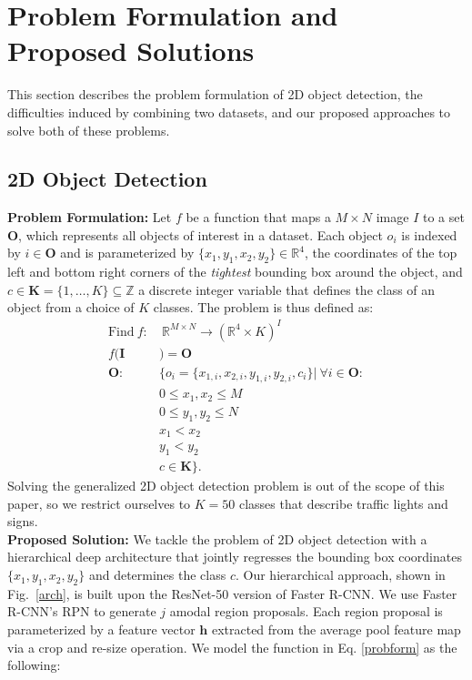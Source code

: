 \documentclass[10pt, conference, compsocconf]{IEEEtran}
\newcommand{\fig}[1]{Fig.~\ref{#1}}
\begin{document}
\section{Problem Formulation and Proposed Solutions} \label{prob_form}
This section describes the problem formulation of 2D object detection, the difficulties induced by combining two datasets, and our proposed approaches to solve both of these problems.

\subsection{2D Object Detection}
\noindent\textbf{Problem Formulation:} 
Let $f$ be a function that maps a $M \times N$ image $I$ to a set $\bm{O}$, which represents all objects of interest in a dataset. Each object $o_i$ is indexed by $i \in \bm{O}$ and is parameterized by $\{x_1,y_1,x_2,y_2\} \in \mathbb{R}^4$, the coordinates of the top left and bottom right corners of the \textit{tightest} bounding box around the object, and $c \in \bm{K}=\{1, \ldots, K\} \subseteq \mathbb{Z}$ a discrete integer variable that defines the class of an object from a choice of $K$ classes.
The problem is thus defined as:   
\begin{equation}
 \begin{aligned}
 \mbox{Find} \ f:& \ \mathbb{R}^{M\times N} \rightarrow (\mathbb{R}^4 \times K)^I  \\
 f(\bm{I}&)=\bm{O} \\ 
 \bm{O}: \ &\{o_i=\{ x_{1,i},x_{2,i},y_{1,i},y_{2,i},c_i\}| \ \forall i \in \bm{O}: \\
 & 0 \leq x_1, x_2 \leq M\\
 & 0\leq y_1, y_2 \leq N\\
 & x_1 < x_2 \\
 & y_1 < y_2 \\
 & c \in \bm{K}\}.
 \end{aligned}
 \label{probform}
\end{equation}
Solving the generalized 2D object detection problem is out of the scope of this paper, so we restrict ourselves to $K=50$ classes that describe traffic lights and signs.
\\

\noindent\textbf{Proposed Solution:} 
We tackle the problem of 2D object detection with a hierarchical deep architecture that jointly regresses the bounding box coordinates $\{x_1,y_1,x_2,y_2\}$ and determines the class $c$. Our hierarchical approach, shown in \fig{arch}, is built upon the ResNet-50 \cite{He} version of Faster R-CNN. We use Faster R-CNN's RPN to generate $j$ amodal region proposals. Each region proposal is parameterized by a feature vector $\bm{h}$ extracted from the average pool feature map via a crop and re-size operation. We model the function in Eq. \ref{probform} as the following:
\end{document}
